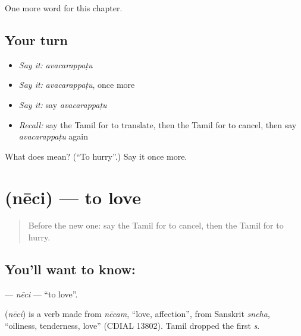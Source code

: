 \begin{grammarlens}[title={What you've built}]
One more word for this chapter.
\end{grammarlens}

\subsection*{Your turn}
\begin{itemize}
\raggedright
  \item \emph{Say it:} \emph{avacarappaṭu}
  \item \emph{Say it:} \emph{avacarappaṭu}, once more
  \item \emph{Say it:} say \emph{avacarappaṭu}
  \item \emph{Recall:} say the Tamil for to translate, then the Tamil for to cancel, then say \emph{avacarappaṭu} again
\end{itemize}

\begin{tcolorbox}[breakable,colback=teal!4,colframe=teal!35!black,title={Before you move on}]
What does  mean? (\textquotedblleft{}To hurry\textquotedblright{}.) Say it once more.
\end{tcolorbox}
\section[\texorpdfstring{\ta{நேசி} (nēci)}{நேசி (nēci)}]{ (nēci) — to love}

\label{lesson:TA-C228-neci}



\begin{quote}
Before the new one: say the Tamil for to cancel, then the Tamil for to hurry.
\end{quote}

\subsection*{You'll want to know: }
\textbf{} — \emph{nēci} — \textquotedblleft{}to love\textquotedblright{}.

\begin{cousinweb}
\textbf{} (\emph{nēci}) is a verb made from \emph{nēcam}, \textquotedblleft{}love, affection\textquotedblright{}, from Sanskrit \emph{sneha}, \textquotedblleft{}oiliness, tenderness, love\textquotedblright{} (CDIAL 13802). Tamil dropped the first \emph{s}.
\end{cousinweb}

